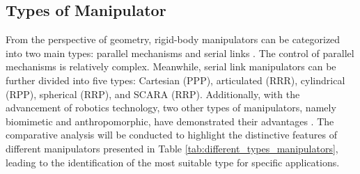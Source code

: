 \subsection{Types of Manipulator}
From the perspective of geometry, rigid-body manipulators can be categorized into two main types: parallel 
mechanisms and serial links \cite{MECH0089book}. The control of parallel mechanisms is relatively complex. 
Meanwhile, serial link manipulators can be further divided into five types: Cartesian (PPP), articulated (RRR), 
cylindrical (RPP), spherical (RRP), and SCARA (RRP). Additionally, with the advancement of robotics technology, 
two other types of manipulators, namely biomimetic and anthropomorphic, have demonstrated their advantages 
\cite{manipulators_types1,manipulators_types2}.
The comparative analysis will be conducted to highlight the distinctive features of different manipulators 
presented in Table \ref{tab:different_types_manipulators}, leading to the identification of the most suitable 
type for specific applications.
